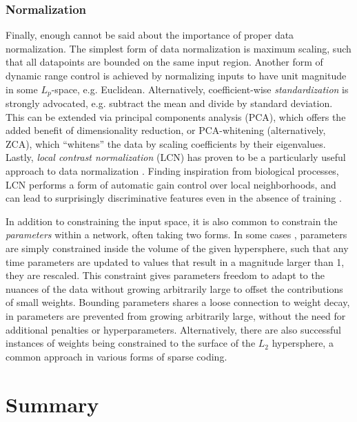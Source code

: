 \subsubsection{Normalization}

Finally, enough cannot be said about the importance of proper data normalization.
The simplest form of data normalization is maximum scaling, such that all datapoints are bounded on the same input region.
Another form of dynamic range control is achieved by normalizing inputs to have unit magnitude in some $L_p$-space, e.g. Euclidean.
Alternatively, coefficient-wise \emph{standardization} is strongly advocated, e.g. subtract the mean and divide by standard deviation.
This can be extended via principal components analysis (PCA), which offers the added benefit of dimensionality reduction, or PCA-whitening (alternatively, ZCA), which ``whitens'' the data by scaling coefficients by their eigenvalues.
Lastly, \emph{local contrast normalization} (LCN) has proven to be a particularly useful approach to data normalization \cite{Sermanet2013Pedestrian}.
Finding inspiration from biological processes, LCN performs a form of automatic gain control over local neighborhoods, and can lead to surprisingly discriminative features even in the absence of training \cite{Kavukcuoglu2010Learning}.

In addition to constraining the input space, it is also common to constrain the \emph{parameters} within a network, often taking two forms.
In some cases \cite{Hinton2012Improving}, parameters are simply constrained inside the volume of the given hypersphere, such that any time parameters are updated to values that result in a magnitude larger than 1, they are rescaled.
This constraint gives parameters freedom to adapt to the nuances of the data without growing arbitrarily large to offset the contributions of small weights.
Bounding parameters shares a loose connection to weight decay, in parameters are prevented from growing arbitrarily large, without the need for additional penalties or hyperparameters.
Alternatively, there are also successful instances of weights being constrained to the surface of the $L_2$ hypersphere, a common approach in various forms of sparse coding.


\section{Summary}
\label{sec:deep_summary}

